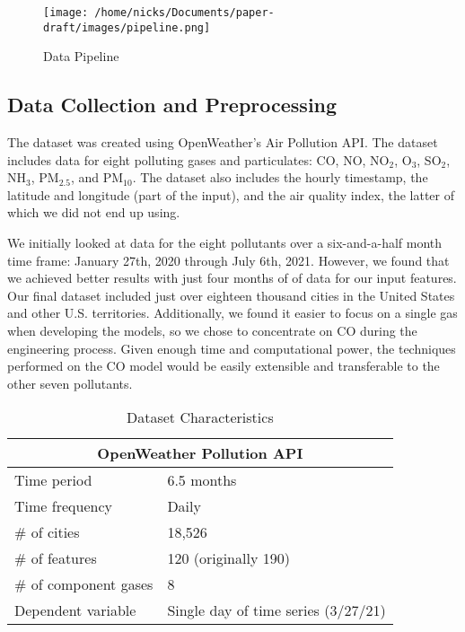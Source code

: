 \documentclass{article}
\begin{document}
\begin{figure}[h]
\texttt{[image: /home/nicks/Documents/paper-draft/images/pipeline.png]}
\caption{Data Pipeline}
\label{fig:pipeline}
\end{figure}

\subsection{Data Collection and Preprocessing}
The dataset was created using OpenWeather's Air Pollution API. The dataset includes data for 
eight polluting gases and particulates: CO, NO, NO$_2$, O$_3$, SO$_2$, NH$_3$, PM$_{2.5}$, 
and PM$_{10}$. The dataset also includes the hourly timestamp, the latitude and longitude (part of the input),
and the air quality index, the latter of which we did not end up using.\par
We initially looked at data for the eight pollutants over a six-and-a-half month time 
frame: January 27th, 2020 through July 6th, 2021. However, we found that we achieved
better results with just four months of of data for our input features. Our final 
dataset included just over eighteen thousand cities in the United States and other U.S. 
territories. Additionally, we found it easier to focus on a single gas when developing 
the models, so we chose to concentrate on CO during the engineering process. Given
enough time and computational power, the techniques performed on the CO model would be 
easily extensible and transferable to the other seven pollutants.


\begin{table}[h!]
    \caption{Dataset Characteristics}
    \label{tab:table1}
    \vspace{0.1cm}
    \begin{tabular}{p{4cm}p{7cm}}
        \hline
        \multicolumn{2}{c}{OpenWeather Pollution API} \\
        \hline
        Time period  & 6.5 months    \\
        Time frequency & Daily  \\
        $\#$ of cities & 18,526 \\
        $\#$ of features & 120 (originally 190) \\
        $\#$ of component gases & 8 \\
        Dependent variable & Single day of time series (3/27/21) \\
        \hline
    \end{tabular}
\end{table}
\end{document}
